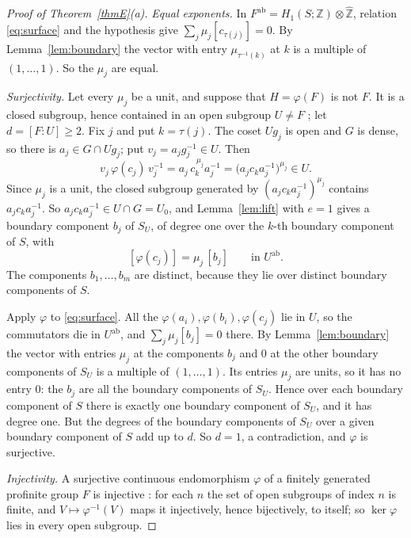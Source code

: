 \documentclass[11pt]{amsart}
\theoremstyle{definition}
\theoremstyle{remark}
\newcommand{\Z}{\mathbb Z}
\newcommand{\Zh}{\widehat{\mathbb Z}}
\newcommand{\ab}{\mathrm{ab}}
\newcommand{\ph}{\varphi}
\begin{document}
\begin{proof}[Proof of Theorem~\ref{thmE}(a)]
\emph{Equal exponents.} In $F^{\ab}=H_1(S;\Z)\otimes\Zh$, relation \eqref{eq:surface} and the hypothesis give $\sum_j\mu_j[c_{\tau(j)}]=0$. By Lemma~\ref{lem:boundary} the vector with entry $\mu_{\tau^{-1}(k)}$ at $k$ is a multiple of $(1,\dots,1)$. So the $\mu_j$ are equal.

\emph{Surjectivity.} Let every $\mu_j$ be a unit, and suppose that $H=\ph(F)$ is not $F$. It is a closed subgroup, hence contained in an open subgroup $U\ne F$ \cite[\S2.1]{RZ}; let $d=[F:U]\ge2$. Fix $j$ and put $k=\tau(j)$. The coset $Ug_j$ is open and $G$ is dense, so there is $a_j\in G\cap Ug_j$; put $v_j=a_jg_j^{-1}\in U$. Then
\[
 v_j\,\ph(c_j)\,v_j^{-1}=a_j\,c_k^{\,\mu_j}a_j^{-1}=\bigl(a_jc_ka_j^{-1}\bigr)^{\mu_j}\in U .
\]
Since $\mu_j$ is a unit, the closed subgroup generated by $(a_jc_ka_j^{-1})^{\mu_j}$ contains $a_jc_ka_j^{-1}$. So $a_jc_ka_j^{-1}\in U\cap G=U_0$, and Lemma~\ref{lem:lift} with $e=1$ gives a boundary component $b_j$ of $S_U$, of degree one over the $k$-th boundary component of $S$, with
\[
 [\ph(c_j)]=\mu_j\,[b_j]\qquad\text{in }U^{\ab}.
\]
The components $b_1,\dots,b_m$ are distinct, because they lie over distinct boundary components of $S$.

Apply $\ph$ to \eqref{eq:surface}. All the $\ph(a_i),\ph(b_i),\ph(c_j)$ lie in $U$, so the commutators die in $U^{\ab}$, and $\sum_j\mu_j[b_j]=0$ there. By Lemma~\ref{lem:boundary} the vector with entries $\mu_j$ at the components $b_j$ and $0$ at the other boundary components of $S_U$ is a multiple of $(1,\dots,1)$. Its entries $\mu_j$ are units, so it has no entry $0$: the $b_j$ are all the boundary components of $S_U$. Hence over each boundary component of $S$ there is exactly one boundary component of $S_U$, and it has degree one. But the degrees of the boundary components of $S_U$ over a given boundary component of $S$ add up to $d$. So $d=1$, a contradiction, and $\ph$ is surjective.

\emph{Injectivity.} A surjective continuous endomorphism $\ph$ of a finitely generated profinite group $F$ is injective \cite[\S2.5]{RZ}: for each $n$ the set of open subgroups of index $n$ is finite, and $V\mapsto\ph^{-1}(V)$ maps it injectively, hence bijectively, to itself; so $\ker\ph$ lies in every open subgroup.
\end{proof}
\end{document}
